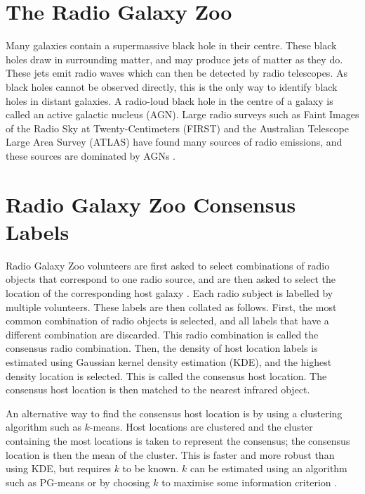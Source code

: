 \documentclass[11pt]{book}
\begin{document}
\section{The Radio Galaxy Zoo}
\label{sec:rgz}

    Many galaxies contain a supermassive black hole in their centre. These black holes draw in surrounding matter, and may produce jets of matter as they do. These jets emit radio waves  which can then be detected by radio telescopes. As black holes cannot be observed directly, this is the only way to identify black holes in distant galaxies. A radio-loud black hole in the centre of a galaxy is called an active galactic nucleus (AGN).  Large radio surveys such as Faint Images of the Radio Sky at Twenty-Centimeters (FIRST) \cite{white97, becker95} and the Australian Telescope Large Area Survey (ATLAS) \cite{franzen15} have found many sources of radio emissions, and these sources are dominated by AGNs \cite{banfield15}.

\section{Radio Galaxy Zoo Consensus Labels}
\label{sec:consensuses}
    
    Radio Galaxy Zoo volunteers are first asked to select combinations of radio objects that correspond to one radio source, and are then asked to select the location of the corresponding host galaxy \cite{banfield15}. Each radio subject is labelled by multiple volunteers. These labels are then collated as follows. First, the most common combination of radio objects is selected, and all labels that have a different combination are discarded. This radio combination is called the consensus radio combination. Then, the density of host location labels is estimated using Gaussian kernel density estimation (KDE), and the highest density location is selected. This is called the consensus host location. The consensus host location is then matched to the nearest infrared object.

    An alternative way to find the consensus host location is by using a clustering algorithm such as $k$-means. Host locations are clustered and the cluster containing the most locations is taken to represent the consensus; the consensus location is then the mean of the cluster. This is faster and more robust than using KDE, but requires $k$ to be known. $k$ can be estimated using an algorithm such as PG-means \cite{hamerly07} or by choosing $k$ to maximise some information criterion .
\end{document}
